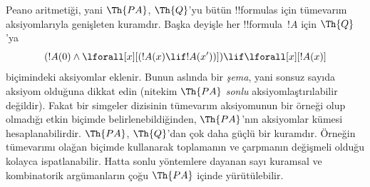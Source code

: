 



Peano aritmetiği, yani $\Th{PA}$, $\Th{Q}$'yu bütün !!{formula}s için
tümevarım aksiyomlarıyla genişleten kuramdır. Başka deyişle her
!!{formula}~$!A$ için $\Th{Q}$'ya
\[
(!A(0) \land \lforall[x][(!A(x) \lif !A(x'))]) \lif \lforall[x][!A(x)]
\]
biçimindeki aksiyomlar eklenir. Bunun aslında bir \emph{şema}, yani sonsuz
sayıda aksiyom olduğuna dikkat edin (nitekim $\Th{PA}$ {\em sonlu}
aksiyomlaştırılabilir değildir). Fakat bir simgeler dizisinin tümevarım
aksiyomunun bir örneği olup olmadığı etkin biçimde belirlenebildiğinden,
$\Th{PA}$'nın aksiyomlar kümesi hesaplanabilirdir. $\Th{PA}$, $\Th{Q}$'dan
çok daha güçlü bir kuramdır. Örneğin tümevarımı olağan biçimde kullanarak
toplamanın ve çarpmanın değişmeli olduğu kolayca ispatlanabilir. Hatta sonlu
yöntemlere dayanan sayı kuramsal ve kombinatorik argümanların çoğu $\Th{PA}$
içinde yürütülebilir.

